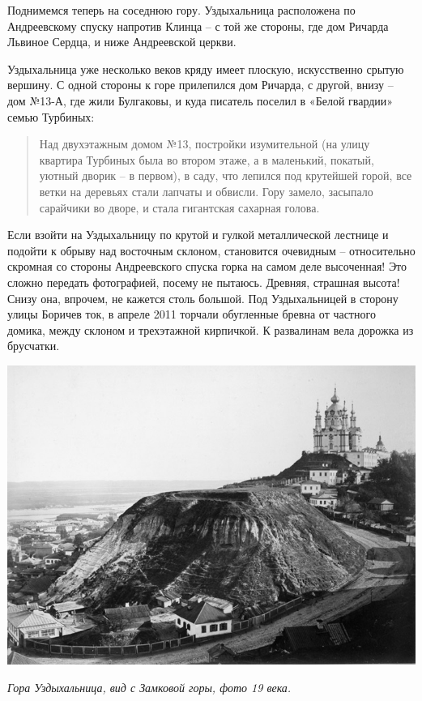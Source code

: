 Поднимемся теперь на соседнюю гору. Уздыхальница расположена по Андреевскому спуску напротив Клинца – с той же стороны, где дом Ричарда Львиное Сердца, и ниже Андреевской церкви.

Уздыхальница уже несколько веков кряду имеет плоскую, искусственно срытую вершину. С одной стороны к горе прилепился дом Ричарда, с другой, внизу – дом №13-А, где жили Булгаковы, и куда писатель поселил в «Белой гвардии» семью Турбиных:

\begin{quotation}
Над двухэтажным домом №13, постройки изумительной (на улицу квартира Турбиных была во втором этаже, а в маленький, покатый, уютный дворик – в первом), в саду, что лепился под крутейшей горой, все ветки на деревьях стали лапчаты и обвисли. Гору замело, засыпало сарайчики во дворе, и стала гигантская сахарная голова. 
\end{quotation}

Если взойти на Уздыхальницу по крутой и гулкой металлической лестнице и подойти к обрыву над восточным склоном, становится очевидным – относительно скромная со стороны Андреевского спуска горка на самом деле высоченная! Это сложно передать фотографией, посему не пытаюсь. Древняя, страшная высота! Снизу она, впрочем, не кажется столь большой. Под Уздыхальницей в сторону улицы Боричев ток, в апреле 2011 торчали обугленные бревна от частного домика, между склоном и трехэтажной кирпичкой. К развалинам вела дорожка из брусчатки.

\begin{center}
\includegraphics[width=\linewidth]{chast-colebanie-osnov/gora-zamkovaya-valovaya/andreevskiy_spusk.jpg}

\textit{Гора Уздыхальница, вид с Замковой горы, фото 19 века.}
\end{center}

